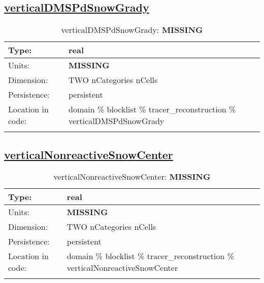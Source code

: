 \subsection[verticalDMSPdSnowGrady]{\hyperref[sec:var_tab_tracer_reconstruction]{verticalDMSPdSnowGrady}}
\label{subsec:var_sec_tracer_reconstruction_verticalDMSPdSnowGrady}
\begin{center}
\begin{longtable}{| p{2.0in} | p{4.0in} |}
        \hline 
        Type: & real \\
        \hline 
        Units: & {\bf \color{red} MISSING} \\
        \hline 
        Dimension: & TWO nCategories nCells \\
        \hline 
        Persistence: & persistent \\
        \hline 
         Location in code: & domain \% blocklist \% tracer\_reconstruction \% verticalDMSPdSnowGrady \\
         \hline 
    \caption{verticalDMSPdSnowGrady: {\bf \color{red} MISSING}}
\end{longtable}
\end{center}
\subsection[verticalNonreactiveSnowCenter]{\hyperref[sec:var_tab_tracer_reconstruction]{verticalNonreactiveSnowCenter}}
\label{subsec:var_sec_tracer_reconstruction_verticalNonreactiveSnowCenter}
\begin{center}
\begin{longtable}{| p{2.0in} | p{4.0in} |}
        \hline 
        Type: & real \\
        \hline 
        Units: & {\bf \color{red} MISSING} \\
        \hline 
        Dimension: & TWO nCategories nCells \\
        \hline 
        Persistence: & persistent \\
        \hline 
         Location in code: & domain \% blocklist \% tracer\_reconstruction \% verticalNonreactiveSnowCenter \\
         \hline 
    \caption{verticalNonreactiveSnowCenter: {\bf \color{red} MISSING}}
\end{longtable}
\end{center}
